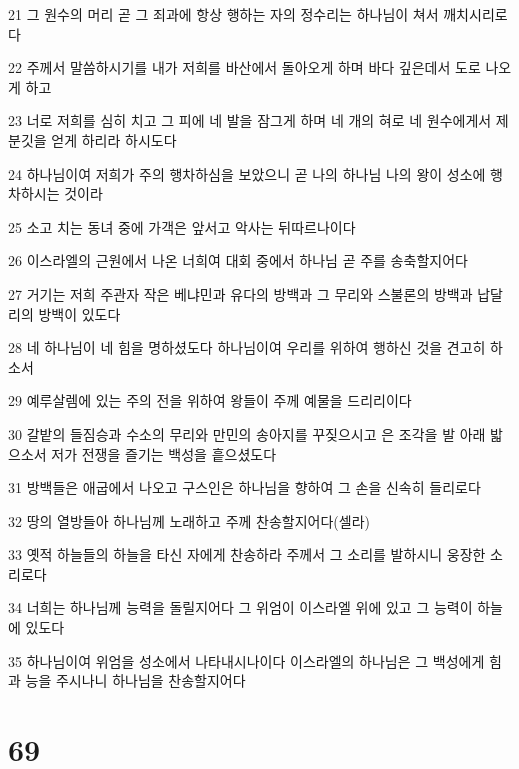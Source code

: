 \par 21 그 원수의 머리 곧 그 죄과에 항상 행하는 자의 정수리는 하나님이 쳐서 깨치시리로다
\par 22 주께서 말씀하시기를 내가 저희를 바산에서 돌아오게 하며 바다 깊은데서 도로 나오게 하고
\par 23 너로 저희를 심히 치고 그 피에 네 발을 잠그게 하며 네 개의 혀로 네 원수에게서 제 분깃을 얻게 하리라 하시도다
\par 24 하나님이여 저희가 주의 행차하심을 보았으니 곧 나의 하나님 나의 왕이 성소에 행차하시는 것이라
\par 25 소고 치는 동녀 중에 가객은 앞서고 악사는 뒤따르나이다
\par 26 이스라엘의 근원에서 나온 너희여 대회 중에서 하나님 곧 주를 송축할지어다
\par 27 거기는 저희 주관자 작은 베냐민과 유다의 방백과 그 무리와 스불론의 방백과 납달리의 방백이 있도다
\par 28 네 하나님이 네 힘을 명하셨도다 하나님이여 우리를 위하여 행하신 것을 견고히 하소서
\par 29 예루살렘에 있는 주의 전을 위하여 왕들이 주께 예물을 드리리이다
\par 30 갈밭의 들짐승과 수소의 무리와 만민의 송아지를 꾸짖으시고 은 조각을 발 아래 밟으소서 저가 전쟁을 즐기는 백성을 흩으셨도다
\par 31 방백들은 애굽에서 나오고 구스인은 하나님을 향하여 그 손을 신속히 들리로다
\par 32 땅의 열방들아 하나님께 노래하고 주께 찬송할지어다(셀라)
\par 33 옛적 하늘들의 하늘을 타신 자에게 찬송하라 주께서 그 소리를 발하시니 웅장한 소리로다
\par 34 너희는 하나님께 능력을 돌릴지어다 그 위엄이 이스라엘 위에 있고 그 능력이 하늘에 있도다
\par 35 하나님이여 위엄을 성소에서 나타내시나이다 이스라엘의 하나님은 그 백성에게 힘과 능을 주시나니 하나님을 찬송할지어다

\chapter{69}

